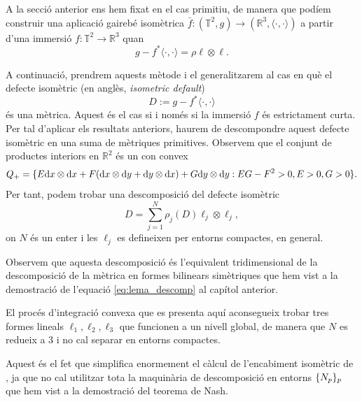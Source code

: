 A la secció anterior ens hem fixat en el cas primitiu, de manera que podíem construir una aplicació gairebé isomètrica $\bar f:(\mathbb T^2, g)\to(\mathbb R^3, \langle\cdot, \cdot\rangle)$ a partir d'una immersió $f:\mathbb T^2\to\mathbb R^3$ quan
\begin{equation*}
    g - f^*\langle\cdot, \cdot\rangle = \rho\ell\otimes\ell.
\end{equation*}

A continuació, prendrem aquests mètode i el generalitzarem al cas en què el defecte isomètric (en anglès, \textit{isometric default}) 
\begin{equation*}
    D:=g-f^*\langle\cdot, \cdot\rangle
\end{equation*}
és una mètrica. Aquest és el cas si i només si la immersió $f$ és estrictament curta. Per tal d'aplicar els resultats anteriors, haurem de descompondre aquest defecte isomètric en una suma de mètriques primitives. Observem que el conjunt de productes interiors en $\mathbb R^2$ és un con convex
\begin{equation*}
    Q_+ = \{E\text dx\otimes\text dx + F(\text dx\otimes\text dy + \text dy\otimes\text dx) + G\text dy\otimes\text dy : EG-F^2>0, E>0, G>0\}.
\end{equation*}
Per tant, podem trobar una descomposició del defecte isomètric
\begin{equation*}
    D = \sum_{j=1}^N \rho_j(D) \ell_j\otimes\ell_j,
\end{equation*}
on $N$ és un enter i les $\ell_j$ es defineixen per entorns compactes, en general.
\begin{obs}
    Observem que aquesta descomposició és l'equivalent tridimensional de la descomposició de la mètrica en formes bilinears simètriques que hem vist a la demostració de l'equació \eqref{eq:lema_descomp} al capítol anterior.
\end{obs}

El procés d'integració convexa que es presenta aquí aconsegueix trobar tres formes lineals $\ell_1, \ell_2, \ell_3$ que funcionen a un nivell global, de manera que $N$ es redueix a $3$ i no cal separar en entorns compactes.

\begin{obs}
    Aquest és el fet que simplifica enormement el càlcul de l'encabiment isomètric de \citet{borrelli2013}, ja que no cal utilitzar tota la maquinària de descomposició en entorns $\{N_p\}_p$ que hem vist a la demostració del teorema de Nash.
\end{obs}

